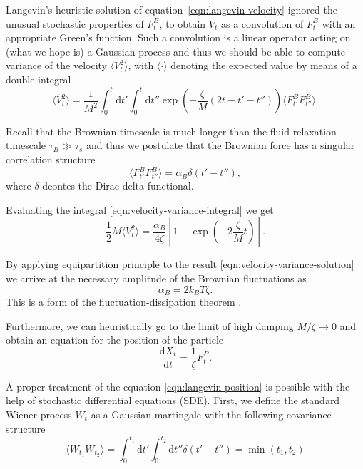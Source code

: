 \documentclass[physics]{doctoral}
\newcommand{\dd}{\mathrm{d}}
\begin{document}
Langevin's heuristic solution of equation~\eqref{eqn:langevin-velocity} ignored the unusual stochastic properties of $F^{B}_t$, to obtain $V_t$ as a convolution of $F_t^B$ with an appropriate Green's function.
Such a convolution is a linear operator acting on (what we hope is) a Gaussian process and thus we should be able to compute variance of the velocity $\langle V_t^2 \rangle$, with $\langle \cdot \rangle$ denoting the expected value by means of a double integral
\begin{equation}
    \langle V_t^2 \rangle = \frac{1}{M^2} \int_0^t \dd t' \int_0^t \dd t'' \exp\left( - \frac{\zeta}{M} (2t - t' - t'') \right) \langle F_{t'}^B F_{t''}^B \rangle.
    \label{eqn:velocity-variance-integral}
\end{equation}

Recall that the Brownian timescale is much longer than the fluid relaxation timescale $\tau_B \gg \tau_s$ and thus we postulate that the Brownian force has a singular correlation structure
\begin{equation}
    \langle F_{t'}^B F_{t''}^B \rangle = \alpha_B \delta(t'-t''), \label{eqn:white-noise-langevin}
\end{equation}
where $\delta$ deontes the Dirac delta functional.

Evaluating the integral \eqref{eqn:velocity-variance-integral} we get
\begin{equation}
    \frac{1}{2} M \langle V_t^2 \rangle = \frac{\alpha_B}{4 \zeta} \left[ 1 - \exp \left(-2 \frac{\zeta}{M} t \right) \right].
    \label{eqn:velocity-variance-solution}
\end{equation}

By applying equipartition principle to the result \eqref{eqn:velocity-variance-solution} we arrive at the necessary amplitude of the Brownian fluctuations as
\begin{equation}
    \alpha_B = 2 k_B T \zeta.
    \label{eqn:fluctuation-dissipation-raighley-particle}
\end{equation}
This is a form of the fluctuation-dissipation theorem \cite{van_Kampen_1984,Ottinger_2012}.

Furthermore, we can heuristically go to the limit of high damping $M/\zeta \to 0$ and obtain an equation for the position of the particle
\begin{equation}
    \frac{\dd X_t}{\dd t} = \frac{1}{\zeta} F_t^B.
    \label{eqn:langevin-position}
\end{equation}

A proper treatment of the equation \eqref{eqn:langevin-position} is possible with the help of stochastic differential equations (SDE).
First, we define the standard Wiener process $W_t$ as a Gaussian martingale with the following covariance structure
\begin{equation}
    \langle W_{t_1} W_{t_2} \rangle = \int_0^{t_1} \dd t' \int_0^{t_2} \dd t'' \delta(t' - t'') = \min(t_1, t_2) \label{eqn:wiener-process-definition}
\end{equation}
\end{document}

